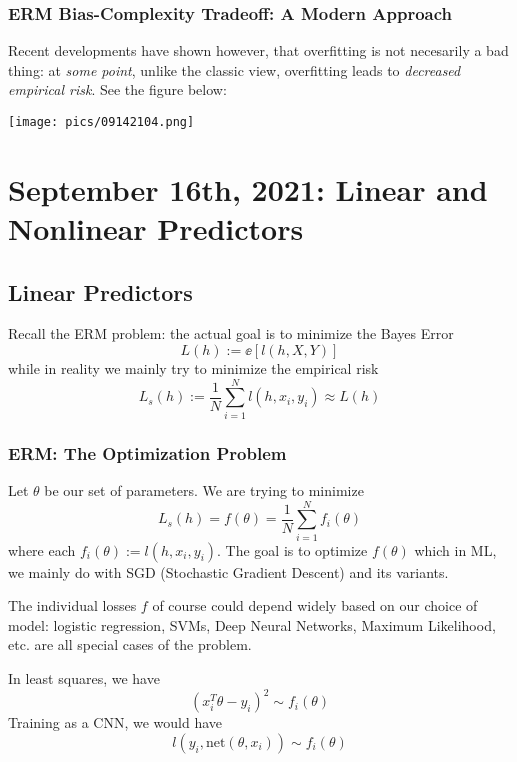 \documentclass[11pt]{scrartcl}
\begin{document}
\subsubsection{ERM Bias-Complexity Tradeoff: A Modern Approach}

Recent developments have shown however, that overfitting is not necesarily a bad thing: at \textit{some point}, unlike the classic view, overfitting leads to \textit{decreased empirical risk}. See the figure below:
\begin{center}
    \texttt{[image: pics/09142104.png]}
\end{center}

\newpage
\section{September 16th, 2021: Linear and Nonlinear Predictors}

\subsection{Linear Predictors}
Recall the ERM problem: the actual goal is to minimize the Bayes Error $$L(h) := \ee[l(h,X,Y)]$$ while in reality we mainly try to minimize the empirical risk $$L_s(h):=\frac{1}{N}\sum_{i=1}^{N}l(h,x_i,y_i) \approx L(h)$$ 

\subsubsection{ERM: The Optimization Problem}
Let $\theta$ be our set of parameters. We are trying to minimize $$L_s(h) = f(\theta) = \frac{1}{N}\sum_{i=1}^{N}f_i(\theta)$$ where each $f_i(\theta):=l(h,x_i,y_i)$. The goal is to optimize $f(\theta)$ which in ML, we mainly do with SGD (Stochastic Gradient Descent) and its variants. 

The individual losses $f$ of course could depend widely based on our choice of model: logistic regression, SVMs, Deep Neural Networks, Maximum Likelihood, etc. are all special cases of the problem.

\begin{ex}
In least squares, we have $$(x_i^{T}\theta-y_i)^2 \sim f_i(\theta)$$
Training as a CNN, we would have $$l(y_i,\text{net}(\theta,x_i)) \sim f_i(\theta)$$
\end{ex}
\end{document}
